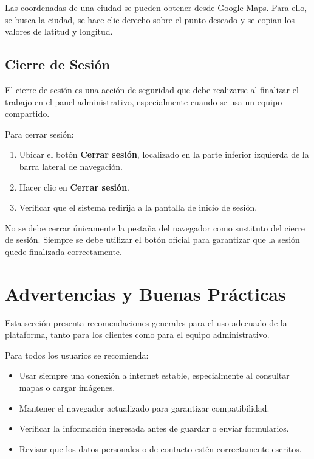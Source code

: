\documentclass[12pt,letterpaper]{article}
\begin{document}
Las coordenadas de una ciudad se pueden obtener desde Google Maps. Para ello, se busca la ciudad, se hace clic derecho sobre el punto deseado y se copian los valores de latitud y longitud.

\subsection{Cierre de Sesión}

El cierre de sesión es una acción de seguridad que debe realizarse al finalizar el trabajo en el panel administrativo, especialmente cuando se usa un equipo compartido.

Para cerrar sesión:

\begin{enumerate}
    \item Ubicar el botón \textbf{Cerrar sesión}, localizado en la parte inferior izquierda de la barra lateral de navegación.
    \item Hacer clic en \textbf{Cerrar sesión}.
    \item Verificar que el sistema redirija a la pantalla de inicio de sesión.
\end{enumerate}

No se debe cerrar únicamente la pestaña del navegador como sustituto del cierre de sesión. Siempre se debe utilizar el botón oficial para garantizar que la sesión quede finalizada correctamente.

\section{Advertencias y Buenas Prácticas}

Esta sección presenta recomendaciones generales para el uso adecuado de la plataforma, tanto para los clientes como para el equipo administrativo.

Para todos los usuarios se recomienda:

\begin{itemize}
    \item Usar siempre una conexión a internet estable, especialmente al consultar mapas o cargar imágenes.
    \item Mantener el navegador actualizado para garantizar compatibilidad.
    \item Verificar la información ingresada antes de guardar o enviar formularios.
    \item Revisar que los datos personales o de contacto estén correctamente escritos.
\end{itemize}
\end{document}
